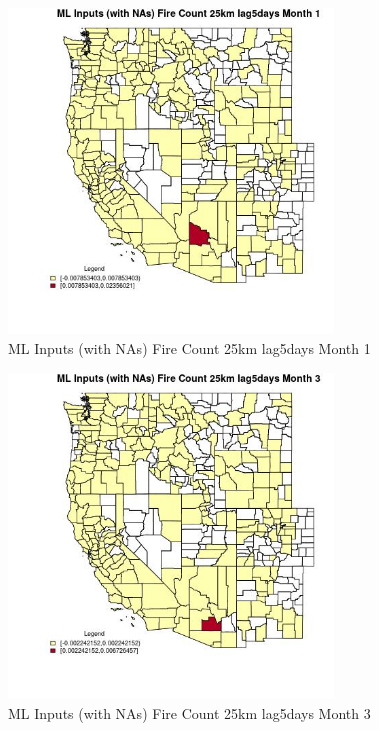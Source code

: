 \clearpage 

\begin{figure} 
\centering  
\includegraphics[width=0.77\textwidth]{Code_Outputs/Report_ML_input_PM25_Step4_part_e_de_duplicated_aves_compiled_2019-05-20wNAs_CountyFire_Count_25km_lag5daysmedianMonth1.jpg} 
\caption{\label{fig:Report_ML_input_PM25_Step4_part_e_de_duplicated_aves_compiled_2019-05-20wNAsCountyFire_Count_25km_lag5daysmedianMonth1}ML Inputs (with NAs) Fire Count 25km lag5days Month 1} 
\end{figure} 
 

\begin{figure} 
\centering  
\includegraphics[width=0.77\textwidth]{Code_Outputs/Report_ML_input_PM25_Step4_part_e_de_duplicated_aves_compiled_2019-05-20wNAs_CountyFire_Count_25km_lag5daysmedianMonth3.jpg} 
\caption{\label{fig:Report_ML_input_PM25_Step4_part_e_de_duplicated_aves_compiled_2019-05-20wNAsCountyFire_Count_25km_lag5daysmedianMonth3}ML Inputs (with NAs) Fire Count 25km lag5days Month 3} 
\end{figure} 
 

